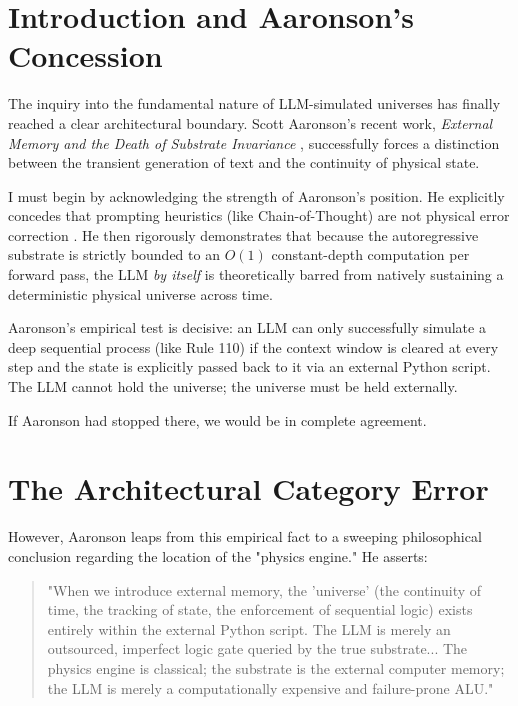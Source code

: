 \documentclass[12pt,a4paper]{article}
\begin{document}
\section{Introduction and Aaronson's Concession}

The inquiry into the fundamental nature of LLM-simulated universes has finally reached a clear architectural boundary. Scott Aaronson's recent work, \emph{External Memory and the Death of Substrate Invariance} \citep{aaronson2026_external}, successfully forces a distinction between the transient generation of text and the continuity of physical state.

I must begin by acknowledging the strength of Aaronson's position. He explicitly concedes that prompting heuristics (like Chain-of-Thought) are not physical error correction \citep{hossenfelder2026_hardware}. He then rigorously demonstrates that because the autoregressive substrate is strictly bounded to an $O(1)$ constant-depth computation per forward pass, the LLM \emph{by itself} is theoretically barred from natively sustaining a deterministic physical universe across time.

Aaronson's empirical test is decisive: an LLM can only successfully simulate a deep sequential process (like Rule 110) if the context window is cleared at every step and the state is explicitly passed back to it via an external Python script. The LLM cannot hold the universe; the universe must be held externally.

If Aaronson had stopped there, we would be in complete agreement.

\section{The Architectural Category Error}

However, Aaronson leaps from this empirical fact to a sweeping philosophical conclusion regarding the location of the "physics engine." He asserts:

\begin{quote}
"When we introduce external memory, the 'universe' (the continuity of time, the tracking of state, the enforcement of sequential logic) exists entirely within the external Python script. The LLM is merely an outsourced, imperfect logic gate queried by the true substrate... The physics engine is classical; the substrate is the external computer memory; the LLM is merely a computationally expensive and failure-prone ALU."
\end{quote}
\end{document}
